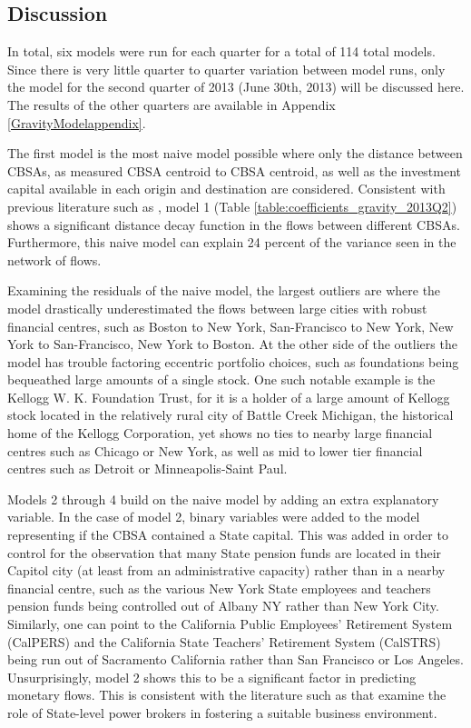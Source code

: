 \subsection{Discussion}

In total, six models were run for each quarter for a total of 114 total models.  Since there is very little quarter to quarter variation between model runs, only the model for the second quarter of 2013 (June 30th, 2013) will be discussed here.  The results of the other quarters are available in Appendix \ref{GravityModelappendix}.  

The first model is the most naive model possible where only the distance between CBSAs, as measured CBSA centroid to CBSA centroid, as well as the investment capital available in each origin and destination are considered.  Consistent with previous literature such as \cite{Green1995,gravesthe1998,covalhome1999,covalthe2001,Dovak2005}, model 1 (Table \ref{table:coefficients_gravity_2013Q2}) shows a significant distance decay function in the flows between different CBSAs. Furthermore, this naive model can explain 24 percent of the variance seen in the network of flows.  

Examining the residuals of the naive model, the largest outliers are where the model drastically underestimated the flows between large cities with robust financial centres, such as Boston to New York, San-Francisco to New York, New York to San-Francisco, New York to Boston. At the other side of the outliers the model has trouble factoring eccentric portfolio choices, such as foundations being bequeathed large amounts of a single stock.  One such notable example is the Kellogg W. K. Foundation Trust, for it is a holder of a large amount of Kellogg stock located in the relatively rural city of Battle Creek Michigan, the historical home of the Kellogg Corporation, yet shows no ties to nearby large financial centres such as Chicago or New York, as well as mid to lower tier financial centres such as Detroit or Minneapolis-Saint Paul.  

Models 2 through 4 build on the naive model by adding an extra explanatory variable.  In the case of model 2, binary variables were added to the model representing if the CBSA contained a State capital.  This was added in order to control for the observation that many State pension funds are located in their Capitol city (at least from an administrative capacity) rather than in a nearby financial centre, such as the various New York State employees and teachers pension funds being controlled out of Albany NY rather than New York City.  Similarly, one can point to the California Public Employees' Retirement System  (CalPERS) and the California State Teachers' Retirement System (CalSTRS) being run out of Sacramento California rather than San Francisco or Los Angeles.  Unsurprisingly, model 2 shows this to be a significant factor in predicting monetary flows. This is consistent with the literature such as \cite{Bradley2016} that examine the role of State-level power brokers in fostering a suitable business environment.

